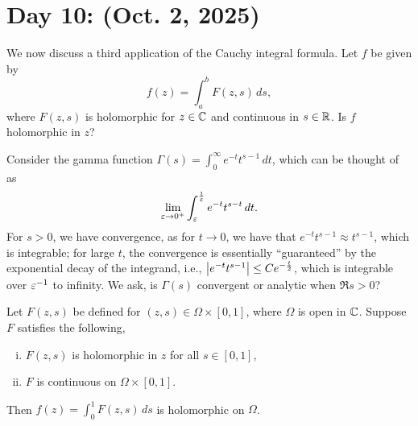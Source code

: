 \section{Day 10: (Oct. 2, 2025)}
We now discuss a third application of the Cauchy integral formula. Let $f$ be given by
\[ f(z) = \int_a^b F(z, s) \, ds, \]
where $F(z, s)$ is holomorphic for $z \in \mathbb C$ and continuous in $s \in \mathbb R$. Is $f$ holomorphic in $z$?
\begin{example}
    Consider the gamma function $\Gamma(s) = \int_0^\infty e^{-t} t^{s-1} \, dt$, which can be thought of as
    \[ \lim_{\varepsilon \to 0^+} \int_\varepsilon^{\frac{1}{\varepsilon}} e^{-t} t^{s-t} \, dt. \]
    For $s > 0$, we have convergence, as for $t \to 0$, we have that $e^{-t} t^{s-1} \approx t^{s-1}$, which is integrable; for large $t$, the convergence is essentially ``guaranteed'' by the exponential decay of the integrand, i.e., $\left\lvert e^{-t} t^{s-1} \right\rvert \leq C e^{-\frac{t}{2}}$, which is integrable over $\varepsilon^{-1}$ to infinity. We ask, is $\Gamma(s)$ convergent or analytic when $\Re s > 0$?
\end{example}
\begin{theorem}
    Let $F(z, s)$ be defined for $(z, s) \in \Omega \times [0, 1]$, where $\Omega$ is open in $\mathbb C$. Suppose $F$ satisfies the following,
    \begin{enumerate}[(i)]
        \item $F(z, s)$ is holomorphic in $z$ for all $s \in [0, 1]$,
        \item $F$ is continuous on $\Omega \times [0, 1]$.
    \end{enumerate}
    Then $f(z) = \int_0^1 F(z, s) \, ds$ is holomorphic on $\Omega$.
\end{theorem}
